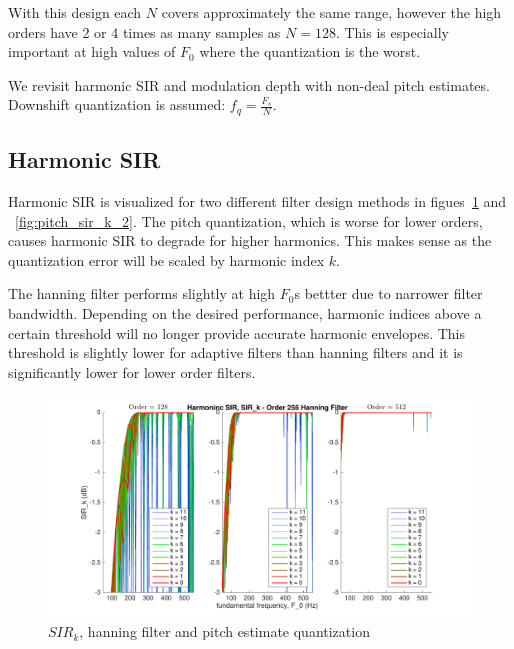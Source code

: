 \documentclass [11pt, proquest,oneside] {ganter_thesis}[2015/03/03]
\begin{document}
With this design each $N$ covers approximately the same range, however the high orders have 2 or 4 times as many samples as $N = 128$.  This is especially important at high values of $F_0$ where the quantization is the worst.

We revisit harmonic SIR and modulation depth with non-deal pitch estimates.  Downshift quantization is assumed: $f_q = \frac{F_s}{N}$.

\subsection{Harmonic SIR}

Harmonic SIR is visualized for two different filter design methods in figues~\ref{fig:pitch_sir_k_1} and ~\ref{fig:pitch_sir_k_2}.  The pitch quantization, which is worse for lower orders, causes harmonic SIR to degrade for higher harmonics.  This makes sense as the quantization error will be scaled by harmonic index $k$.

The hanning filter performs slightly at high $F_0$s bettter due to narrower filter bandwidth.  Depending on the desired performance, harmonic indices above a certain threshold will no longer provide accurate harmonic envelopes.  This threshold is slightly lower for adaptive filters than hanning filters and it is significantly lower for lower order filters.

\begin{figure}[!ht]
  \centering
    \includegraphics[width=1\textwidth]{pitch_sir_k_1}
    \caption{$SIR_k$, hanning filter and pitch estimate quantization}\label{fig:pitch_sir_k_1}
\end{figure}
\end{document}

